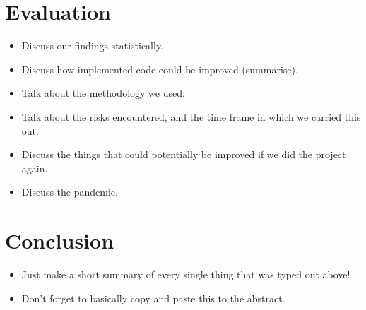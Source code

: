 \documentclass{article}
\begin{document}
\section{Evaluation}
\begin{itemize}
    \item Discuss our findings statistically.
    \item Discuss how implemented code could be improved (summarise).
    \item Talk about the methodology we used.
    \item Talk about the risks encountered, and the time frame in which we carried this out.
    \item Discuss the things that could potentially be improved if we did the project again.
    \item Discuss the pandemic.
\end{itemize}

\section{Conclusion}
\begin{itemize}
    \item Just make a short summary of every single thing that was typed out above!
    \item Don't forget to basically copy and paste this to the abstract.
\end{itemize}


\newpage


\end{document}
